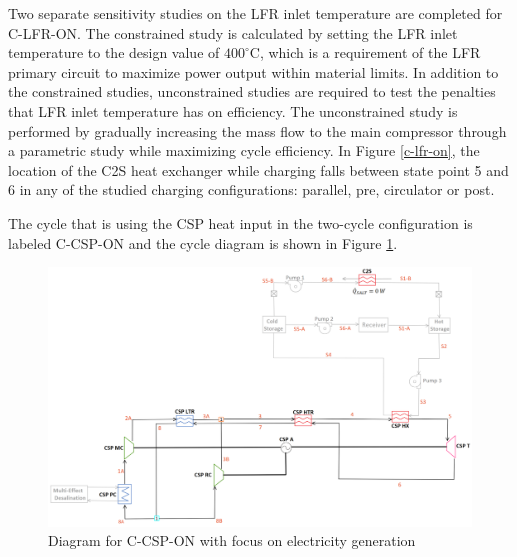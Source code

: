 \begin{paracol}{2}
\linenumbers
\switchcolumn

Two separate sensitivity studies on the LFR inlet temperature are completed for C-LFR-ON. The constrained study is calculated by setting the LFR inlet temperature to the design value of $400^{\circ}$C, which is a requirement of the LFR primary circuit to maximize power output within material limits. In addition to the constrained studies, unconstrained studies are required to test the penalties that LFR inlet temperature has on efficiency. The unconstrained study is performed by gradually increasing the mass flow to the main compressor through a parametric study while maximizing cycle efficiency. In Figure \ref{c-lfr-on}, the location of the C2S heat exchanger while charging falls between state point 5 and 6 in any of the studied charging configurations: parallel, pre, circulator or post. 

The cycle that is using the CSP heat input in the two-cycle configuration is labeled C-CSP-ON and the cycle diagram is shown in Figure \ref{c-csp-on}. 

\end{paracol}
\begin{figure}[H] 
    \widefigure
    \includegraphics[width=\linewidth]{Definitions/c-csp-on.pdf}
    \caption{Diagram for C-CSP-ON with focus on electricity generation\label{c-csp-on}}
\end{figure}
